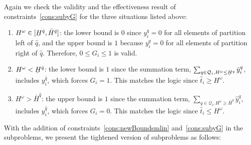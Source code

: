 \documentclass[11pt]{article}
\renewcommand{\underbar}{\underaccent{\bar}}
\begin{document}
	Again we check the validity and the effectiveness result of constraints~\eqref{cons:subyG} for the three situations listed above:
	\begin{enumerate}
		\item 
			\(H^\omega \in [\underbar{H}^{\hat{q}},\bar{H}^{\hat{q}}]\): 
			the lower bound is \(0\) since \(y_i^q = 0\) for all elements of partition left of \(\hat{q}\), and the upper bound is \(1\) because \(y_i^q = 0\) for all elements of partition right of \(\hat{q}\). Therefore, \(0 \leq G_i \leq 1\) is valid.
		\item 
			\(H^\omega < \underbar{H}^{\hat{q}}\): 
			the lower bound is \(1\) since the summation term, 
			\(\sum_{q \in \mathcal{Q}_i, H^\omega \leq \underbar{H}^q} \hat{y}_i^q\), includes \(y_i^{\hat{q}}\), 
			which forces \(G_i = 1\). This matches the logic since \(\hat{t}_i \geq H^\omega\).
		\item 
			\(H^\omega > \bar{H}^{\hat{q}}\): the upper bound is \(1\) since the summation term, \(\sum_{q \in \mathcal{Q}_i, H^\omega \geq \bar{H}^q} \hat{y}_i^q\), includes \(y_i^{\hat{q}}\), which forces \(G_i = 0\). This matches the logic since \(\hat{t}_i \leq H^\omega\).
	\end{enumerate}
	With the addition of constraints~\eqref{cons:newBoundsmlin} and~\eqref{cons:subyG} in the subproblems, we present the tightened version of subproblems as follows: 
\end{document}
